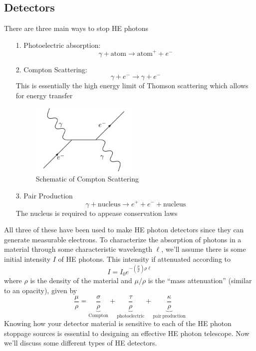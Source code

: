 \documentclass[10pt]{article}
\numberwithin{equation}{section}
\begin{document}
	\subsection{Detectors} %
	\label{sub:detectors}
		There are three main ways to stop HE photons
		\begin{enumerate}
			\item[1.] Photoelectric absorption: 
			\begin{equation*}
				\gamma + \mathrm{atom} \to \mathrm{atom}^+ + e^-
			\end{equation*}
			\item[2.] Compton Scattering:
			\begin{equation*}
				\gamma + e^- \to \gamma + e^-
			\end{equation*}
			This is essentially the high energy limit of Thomson scattering which allows for energy transfer
			\begin{figure}[h]
				\centering
				\includegraphics[width = 2in]{figures/compton_scatter.pdf}
				\caption{Schematic of Compton Scattering}
				\label{fig:1}
			\end{figure}
			\item[3.] Pair Production
			\begin{equation*}
				\gamma + \mathrm{nucleus} \to e^+ + e^- + \mathrm{nucleus}
			\end{equation*}
			The nucleus is required to appease conservation laws
		\end{enumerate}
		All three of these have been used to make HE photon detectors since they can generate measurable electrons. To characterize the absorption of photons in a material through some characteristic wavelength $\ell$, we'll assume there is some initial intensity $I$ of HE photons. This intensity if attenuated according to
		\begin{equation}
			\label{eq:3} I = I_0 e^{-\left(\frac{\mu}{\rho}\right)\rho \ell}
		\end{equation}
		where $\rho$ is the density of the material and $\mu/\rho$ is the ``mass attenuation'' (similar to an opacity), given by
		\begin{equation}
			\label{eq:4} \frac{\mu}{\rho} = \underbrace{\frac{\sigma}{\rho}}_{\mathrm{Compton}} + \underbrace{\frac{\tau}{\rho}}_{\mathrm{photoelectric}} + \underbrace{\frac{\kappa}{\rho}}_{\mathrm{pair\ production}}
		\end{equation}
		Knowing how your detector material is sensitive to each of the HE photon stoppage sources is essential to designing an effective HE photon telescope. Now we'll discuss some different types of HE detectors.\\
		
\end{document}
